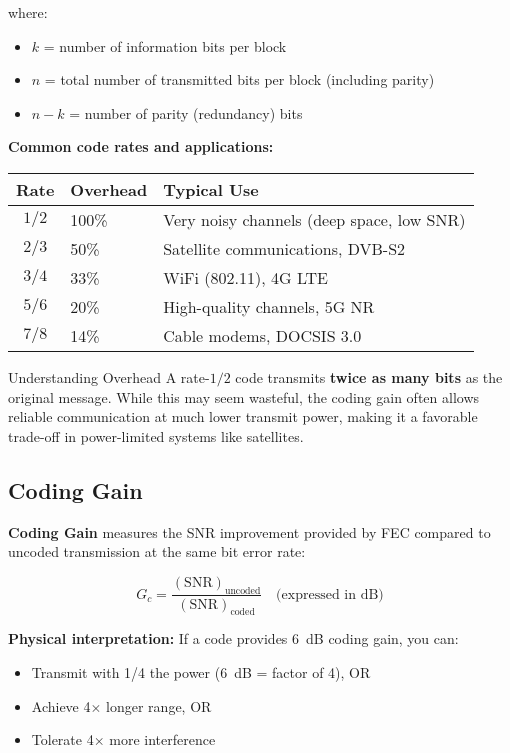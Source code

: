 where:
\begin{itemize}
\item $k$ = number of information bits per block
\item $n$ = total number of transmitted bits per block (including parity)
\item $n - k$ = number of parity (redundancy) bits
\end{itemize}

\textbf{Common code rates and applications:}

\begin{center}
\begin{tabular}{clp{6cm}}
\toprule
\textbf{Rate} & \textbf{Overhead} & \textbf{Typical Use} \\
\midrule
$1/2$ & 100\% & Very noisy channels (deep space, low SNR) \\
$2/3$ & 50\% & Satellite communications, DVB-S2 \\
$3/4$ & 33\% & WiFi (802.11), 4G LTE \\
$5/6$ & 20\% & High-quality channels, 5G NR \\
$7/8$ & 14\% & Cable modems, DOCSIS 3.0 \\
\bottomrule
\end{tabular}
\end{center}

\begin{calloutbox}{Understanding Overhead}
A rate-$1/2$ code transmits \textbf{twice as many bits} as the original message. While this may seem wasteful, the coding gain often allows reliable communication at much lower transmit power, making it a favorable trade-off in power-limited systems like satellites.
\end{calloutbox}

\subsection{Coding Gain}

\textbf{Coding Gain} measures the SNR improvement provided by FEC compared to uncoded transmission at the same bit error rate:

\begin{equation}
G_c = \frac{(\text{SNR})_{\text{uncoded}}}{(\text{SNR})_{\text{coded}}} \quad \text{(expressed in dB)}
\label{eq:fec-coding-gain}
\end{equation}

\textbf{Physical interpretation:} If a code provides 6~dB coding gain, you can:
\begin{itemize}
\item Transmit with 1/4 the power (6~dB = factor of 4), OR
\item Achieve 4$\times$ longer range, OR
\item Tolerate 4$\times$ more interference
\end{itemize}

